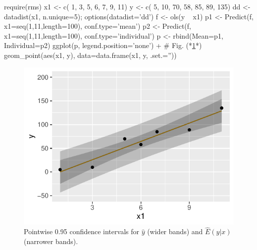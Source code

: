 \begin{Schunk}
\begin{Sinput}
require(rms)
x1 <- c( 1,  3,  5,  6,  7,  9,  11)
y  <- c( 5, 10, 70, 58, 85, 89, 135)
dd <- datadist(x1, n.unique=5); options(datadist='dd')
f <- ols(y ~ x1)
p1 <- Predict(f, x1=seq(1,11,length=100), conf.type='mean')
p2 <- Predict(f, x1=seq(1,11,length=100), conf.type='individual')
p <- rbind(Mean=p1, Individual=p2)
ggplot(p, legend.position='none') +    # Fig. (*\ref{fig:reg-both-type-cls}*)
     geom_point(aes(x1, y), data=data.frame(x1, y, .set.=''))
\end{Sinput}
\begin{figure}[htbp]

\centerline{\includegraphics[width=\maxwidth]{reg-both-type-cls-1} }

\caption[Two types of confidence bands]{Pointwise 0.95 confidence intervals for $\hat{y}$ (wider bands) and $\hat{E}(y|x)$ (narrower bands).}\label{fig:reg-both-type-cls}
\end{figure}
\end{Schunk}
\ei
\clearpage

